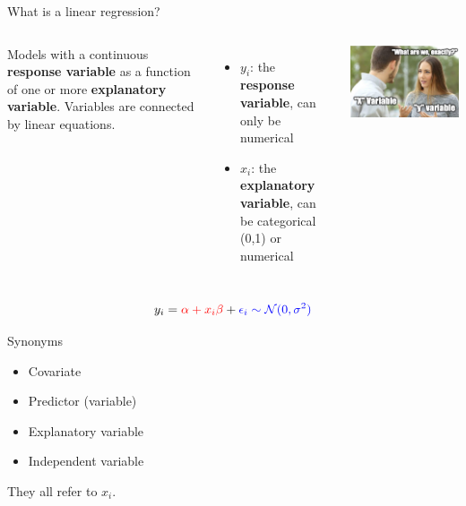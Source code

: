 \documentclass[
  ignorenonframetext,
]{beamer}
\providecommand{\tightlist}{%
  \setlength{\itemsep}{0pt}\setlength{\parskip}{0pt}}
\newcommand{\columnsbegin}{\begin{columns}}
\newcommand{\columnsend}{\end{columns}}
\begin{document}
\begin{frame}{What is a linear regression?}
\label{what-is-a-linear-regression}
\columnsbegin
{}

Models with a continuous \textbf{response variable} as a function of one
or more \textbf{explanatory variable}. Variables are connected by linear
equations.

\begin{itemize}
\tightlist
\item
  \(y_i\): the \textbf{response variable}, can only be numerical
\item
  \(x_i\): the \textbf{explanatory variable}, can be categorical (0,1)
  or numerical
\end{itemize}


\includegraphics{xy.png}

\columnsend

\begin{equation}
y_i = \textcolor{red}{\alpha + x_i\beta} + \textcolor{blue}{\epsilon_i \sim \mathcal{N}(0,\sigma^2)}
\end{equation}
\end{frame}

\begin{frame}{Synonyms}
\label{synonyms}
\begin{itemize}
\tightlist
\item
  Covariate
\item
  Predictor (variable)
\item
  Explanatory variable
\item
  Independent variable
\end{itemize}

They all refer to \(x_i\).
\end{frame}
\end{document}
